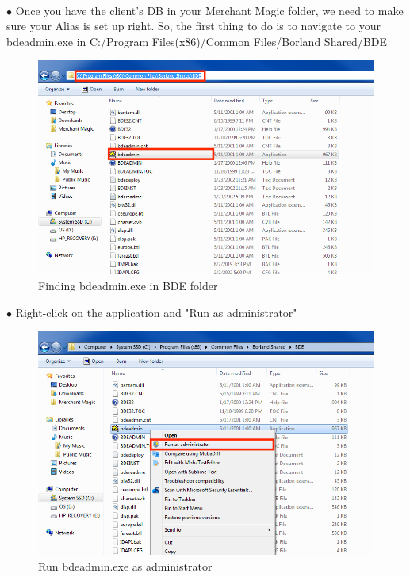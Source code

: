\documentclass[a4paper, 11pt]{article}
\begin{document}
\pagebreak

\vspace*{\fill}
$\bullet$ Once you have the client's DB in your Merchant Magic\textsuperscript{\textregistered} folder, we need to make sure your Alias is set up right. So, the first thing to do is to navigate to your bdeadmin.exe in C:/Program Files(x86)/Common Files/Borland Shared/BDE

\begin{figure}[h]
    \centering
    \includegraphics[width=\textwidth]{capture 13}
    \caption{Finding bdeadmin.exe in BDE folder}
\end{figure}
\vspace*{\fill}

\pagebreak

\vspace*{\fill}
$\bullet$ Right-click on the application and "Run as administrator"

\begin{figure}[h]
    \centering
    \includegraphics[width=\textwidth]{capture 14}
    \caption{Run bdeadmin.exe as administrator}
\end{figure}
\vspace*{\fill}
\end{document}
